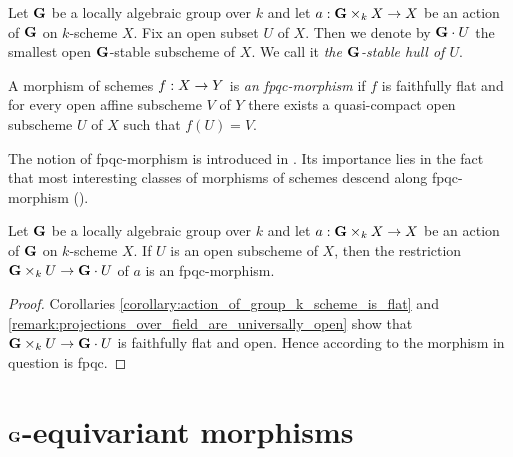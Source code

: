 \begin{definition}
Let $\mathbf{G}$ be a locally algebraic group over $k$ and let $a:\mathbf{G}\times_k X\rightarrow X$ be an action of $\mathbf{G}$ on $k$-scheme $X$. Fix an open subset $U$ of $X$. Then we denote by $\mathbf{G}\cdot U$ the smallest open $\mathbf{G}$-stable subscheme of $X$. We call it \textit{the $\mathbf{G}$-stable hull of $U$}.
\end{definition}

\begin{definition}
A morphism of schemes $f:X\rightarrow Y$ is \textit{an fpqc-morphism} if $f$ is faithfully flat and for every open affine subscheme $V$ of $Y$ there exists a quasi-compact open subscheme $U$ of $X$ such that $f(U) = V$.
\end{definition}
\noindent
The notion of fpqc-morphism is introduced in {\cite[Definition 2.34]{fantechi2005fundamental}}. Its importance lies in the fact that most interesting classes of morphisms of schemes descend along fpqc-morphism ({\cite[Proposition 2.36]{fantechi2005fundamental}}).

\begin{corollary}\label{corollary:restriction_of_actions_of_algebraic_groups_are_fpqc}
Let $\mathbf{G}$ be a locally algebraic group over $k$ and let $a:\mathbf{G}\times_k X\rightarrow X$ be an action of $\mathbf{G}$ on $k$-scheme $X$. If $U$ is an open subscheme of $X$, then the restriction $\mathbf{G}\times_k U \rightarrow \mathbf{G}\cdot U$ of $a$ is an fpqc-morphism.
\end{corollary}
\begin{proof}
Corollaries \ref{corollary:action_of_group_k_scheme_is_flat} and \ref{remark:projections_over_field_are_universally_open} show that $\mathbf{G}\times_k U \rightarrow \mathbf{G}\cdot U$ is faithfully flat and open. Hence according to {\cite[\textit(iii) of Proposition 2.35]{fantechi2005fundamental}} the morphism in question is fpqc.
\end{proof}

\section{$\mathbf{G}$-equivariant morphisms}

